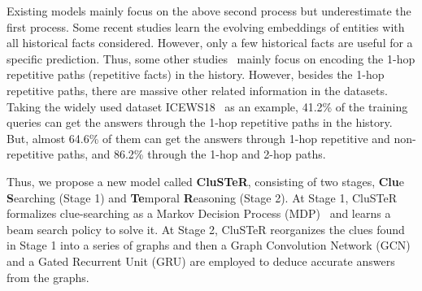 \documentclass[11pt,a4paper]{article}
\begin{document}
Existing models mainly focus on the above second process but
underestimate the first process. Some recent studies
\cite{trivedi2017know,trivedi2018dyrep} learn the evolving embeddings of
entities with all historical facts considered. However, only a few historical
facts are useful for a specific prediction. Thus, some other
studies~\cite{jin2020Renet,jin2019recurrent, zhu2020learning} mainly focus on
encoding the 1-hop repetitive paths (repetitive facts) in the history. However,
besides the 1-hop repetitive paths, there are massive other related information
in the datasets. 
Taking the widely used dataset ICEWS18~\cite{jin2020Renet} as an example, 41.2\%
of the training queries can get the answers through the 1-hop repetitive paths
in the history. But, almost 64.6\% of them can get the answers through 1-hop
repetitive and non-repetitive paths, and 86.2\% through the 1-hop and 2-hop paths.



Thus, we propose a new model called \textbf{CluSTeR}, consisting of two stages,
\textbf{Clu}e \textbf{S}earching (Stage 1) and \textbf{Te}mporal
\textbf{R}easoning (Stage 2). At Stage 1, CluSTeR formalizes clue-searching as a
Markov Decision Process (MDP)~\cite{sutton2018reinforcement} and learns a beam
search policy to solve it. At Stage 2, CluSTeR reorganizes the clues found in
Stage 1 into a series of graphs and then a Graph Convolution Network (GCN) and a
Gated Recurrent Unit (GRU) are employed to deduce accurate answers from the
graphs.


\end{document}

